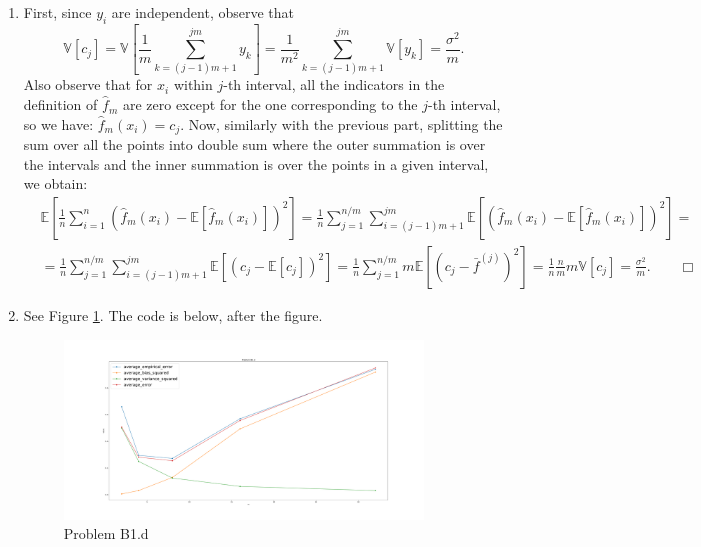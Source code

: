 \documentclass{article}
\newcommand{\1}{\mathbf{1}}
\newcommand{\E}{\mathbb{E}}
\newcommand{\V}{\mathbb{V}}
\begin{document}
\begin{enumerate}
    \item First, since $y_i$ are independent, observe that $$
    \V[c_j] = \V[\frac{1}{m} \sum_{k=(j-1)m+1}^{jm} y_k] = \frac{1}{m^2} \sum_{k=(j-1)m+1}^{jm} \V[y_k] = \frac{\sigma^2}{m}.
    $$
    Also observe that for $x_i$ within $j$-th interval, all the indicators in the definition of $\widehat{f}_m$ are zero except for the one corresponding to the $j$-th interval, so we have: $\widehat{f}_m (x_i) = c_j$.
    Now, similarly with the previous part, splitting the sum over all the points into double sum where the outer summation is over the intervals and the inner summation is over the points in a given interval, we obtain:
    \begin{align*}
                & \E\left[\frac{1}{n} \sum_{i=1}^{n} ( \widehat{f}_m (x_i) - \E[ \widehat{f}_m(x_i)])^2\right] =
                \frac{1}{n} \sum_{j=1}^{n/m} \sum_{i=(j-1)m+1}^{jm} \E[( \widehat{f}_m (x_i) - \E[\widehat{f}_m(x_i)])^2] =\\
                & = \frac{1}{n} \sum_{j=1}^{n/m} \sum_{i=(j-1)m+1}^{jm} \E[( c_j - \E[c_j])^2] =
                \boxed{\frac{1}{n} \sum_{j=1}^{n/m} m \E[( c_j - \bar{f}^{(j)})^2]} = \frac{1}{n}\frac{n}{m}m\V[c_j]
                = \boxed{\frac{\sigma^2}{m}}. \qquad \Box
            \end{align*}
    \item See Figure \ref{figure:b1.d}. The code is below, after the figure.
         \begin{figure}[h!]
            \centering
            \includegraphics[width=0.9\textwidth]{code/b1_d.pdf}
            \caption{Problem B1.d}
            \label{figure:b1.d}
         \end{figure}
         
         \inputminted{python}{code/b1_d.py}
          \caption{Code for B1.d}
          \label{listing:b1.d}
   

\end{enumerate}
\end{document}

